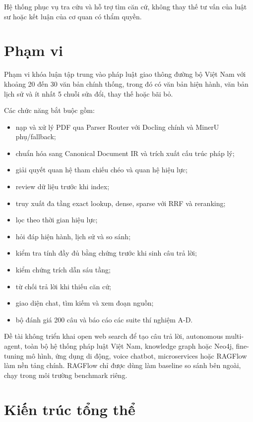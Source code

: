 \documentclass[12pt,a4paper]{article}
\begin{document}
Hệ thống phục vụ tra cứu và hỗ trợ tìm căn cứ, không thay thế tư vấn của luật sư hoặc kết luận của cơ quan có thẩm quyền.

\section{Phạm vi}

Phạm vi khóa luận tập trung vào pháp luật giao thông đường bộ Việt Nam với khoảng 20 đến 30 văn bản chính thống, trong đó có văn bản hiện hành, văn bản lịch sử và ít nhất 5 chuỗi sửa đổi, thay thế hoặc bãi bỏ.

Các chức năng bắt buộc gồm:

\begin{itemize}
  \item nạp và xử lý PDF qua Parser Router với Docling chính và MinerU phụ/fallback;
  \item chuẩn hóa sang Canonical Document IR và trích xuất cấu trúc pháp lý;
  \item giải quyết quan hệ tham chiếu chéo và quan hệ hiệu lực;
  \item review dữ liệu trước khi index;
  \item truy xuất đa tầng exact lookup, dense, sparse với RRF và reranking;
  \item lọc theo thời gian hiệu lực;
  \item hỏi đáp hiện hành, lịch sử và so sánh;
  \item kiểm tra tính đầy đủ bằng chứng trước khi sinh câu trả lời;
  \item kiểm chứng trích dẫn sáu tầng;
  \item từ chối trả lời khi thiếu căn cứ;
  \item giao diện chat, tìm kiếm và xem đoạn nguồn;
  \item bộ đánh giá 200 câu và báo cáo các suite thí nghiệm A-D.
\end{itemize}

Đề tài không triển khai open web search để tạo câu trả lời, autonomous multi-agent, toàn bộ hệ thống pháp luật Việt Nam, knowledge graph hoặc Neo4j, fine-tuning mô hình, ứng dụng di động, voice chatbot, microservices hoặc RAGFlow làm nền tảng chính. RAGFlow chỉ được dùng làm baseline so sánh bên ngoài, chạy trong môi trường benchmark riêng.

\section{Kiến trúc tổng thể}
\end{document}

